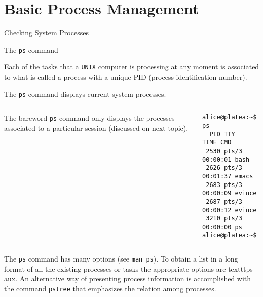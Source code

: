 \section{Basic Process Management}
\begin{frame}[t,fragile]{Checking System Processes}


  \begin{block}{The \alert{\texttt{ps}} command}
    {\footnotesize
 Each of the tasks that a \texttt{UNIX} computer is processing
  at any moment is associated to what is called a \alert{process}
  with a unique \alert{PID} (process identification number).

  The \texttt{ps} command displays current system processes. 

    }

  {\scriptsize

  \begin{columns}
      The bareword \texttt{ps} command only displays the 
  processes associated to a particular session (discussed
  on next topic).
        \hspace{-3cm}
        \begin{lstlisting}
alice@platea:~$ ps
  PID TTY          TIME CMD
 2530 pts/3    00:00:01 bash
 2626 pts/3    00:01:37 emacs
 2683 pts/3    00:00:09 evince
 2687 pts/3    00:00:12 evince
 3210 pts/3    00:00:00 ps
alice@platea:~$ 
        \end{lstlisting}
    \end{columns}
  }
  {\footnotesize
      The \alert{\texttt{ps}} command has many options (see
  \texttt{man ps}). To
  obtain a list in a long format of all the existing processes or
  tasks the appropriate options are \alert{texttt{ps -aux}}. An alternative way
  of presenting process information is accomplished with the command
  \texttt{pstree} that emphasizes the relation among processes.
}
  \end{block}
  
\end{frame}
